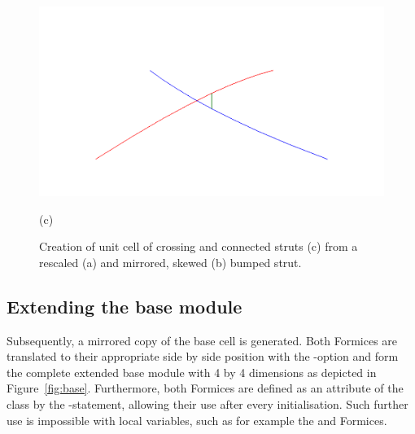 \begin{figure} [ht]
\begin{latexonly}
\hspace{0.3cm}
\begin{minipage} [c] [] [c] {3.5cm}
	\includegraphics [width =\textwidth] {images/WireStentDemot2Step09}
	\begin{center}
	\vspace{-3ex}
	(c)
	\vspace{1ex}
	\end{center}
\end{minipage}
\hspace{0.3cm}	
   \end{latexonly}
   \begin{htmlonly}
   \end{htmlonly}
	\caption {Creation of unit cell of crossing and connected struts (c) from a rescaled (a) and mirrored, skewed (b) bumped strut.} 
	\label{base}	
\end{figure}

\subsection{Extending the base module}

Subsequently, a mirrored copy of the base cell is generated. Both Formices are translated to their appropriate side by side position with the -option and form the complete extended base module with 4 by 4 dimensions as depicted in Figure~\ref{fig:base}. Furthermore, both Formices are defined as an attribute of the  class by the -statement, allowing their use after every  initialisation. Such further use is impossible with local variables, such as for example the  and  Formices.
%


